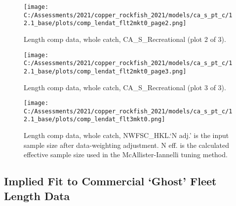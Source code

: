 \documentclass[11pt,
  english,
  a4paper,
]{article}
\begin{document}
\tagmcend\tagstructend


\begin{figure}
\centering
\texttt{[image: C:/Assessments/2021/copper\_rockfish\_2021/models/ca\_s\_pt\_c/12.1\_base/plots/comp\_lendat\_flt2mkt0\_page2.png]}
\caption{Length comp data, whole catch, CA\_S\_Recreational (plot 2 of 3).\label{fig:comp_lendat_flt2mkt0_page2}}
\end{figure}

\tagmcend\tagstructend


\begin{figure}
\centering
\texttt{[image: C:/Assessments/2021/copper\_rockfish\_2021/models/ca\_s\_pt\_c/12.1\_base/plots/comp\_lendat\_flt2mkt0\_page3.png]}
\caption{Length comp data, whole catch, CA\_S\_Recreational (plot 3 of 3).\label{fig:comp_lendat_flt2mkt0_page3}}
\end{figure}

\tagmcend\tagstructend


\begin{figure}
\centering
\texttt{[image: C:/Assessments/2021/copper\_rockfish\_2021/models/ca\_s\_pt\_c/12.1\_base/plots/comp\_lendat\_flt3mkt0.png]}
\caption{Length comp data, whole catch, NWFSC\_HKL.`N adj.' is the input sample size after data-weighting adjustment. N eff. is the calculated effective sample size used in the McAllister-Iannelli tuning method.\label{fig:comp_lendat_flt3mkt0}}
\end{figure}

\tagmcend\tagstructend

\newpage


\hypertarget{implied-fit-to-commercial-ghost-fleet-length-data}{%
\subsection{Implied Fit to Commercial `Ghost' Fleet Length Data}\label{implied-fit-to-commercial-ghost-fleet-length-data}}

\leavevmode\tagmcend\tagstructend
\end{document}
